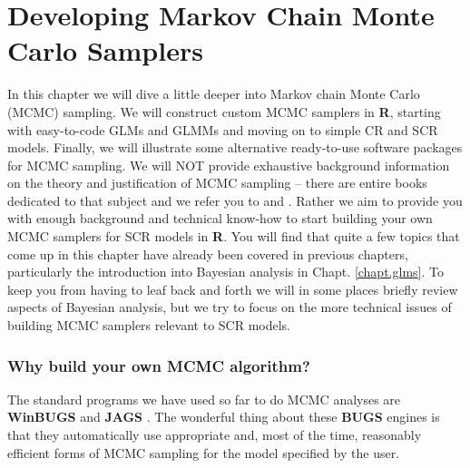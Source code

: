 \chapter{
Developing Markov Chain Monte Carlo Samplers
}
\label{chapt.mcmc}



\vspace{.3in}

In this chapter we will dive a little deeper into Markov chain Monte
Carlo (MCMC) sampling. We will construct custom MCMC samplers in {\bf
  R}, starting with easy-to-code GLMs and GLMMs and moving on to
simple CR and SCR models. Finally, we will illustrate some alternative
ready-to-use software packages for MCMC sampling. We will NOT provide
exhaustive background information on the theory and justification of
MCMC sampling -- there are entire books dedicated to that subject and
we refer you to \citet{robert_casella:2004} and
\citet{robert_casella:2010}. Rather we aim to provide you with enough
background and technical know-how to start building your own MCMC
samplers for SCR models in {\bf R}. You will find that quite a few
topics that come up in this chapter have already been covered in
previous chapters, particularly the introduction into Bayesian
analysis in Chapt. \ref{chapt.glms}. To keep you from having to leaf
back and forth we will in some places briefly review aspects of
Bayesian analysis, but we try to focus on the more technical issues of
building MCMC samplers relevant to SCR models.



\subsection{Why build your own MCMC algorithm?}

The standard programs we have used so far to do MCMC analyses are
{\bf WinBUGS} \citep{gilks_etal:1994} and {\bf JAGS}
\citep{plummer:2003}. The wonderful thing about these {\bf BUGS}
engines
is that they automatically use  appropriate and, most of the time, reasonably
efficient forms
of MCMC sampling for the model specified by the user.

